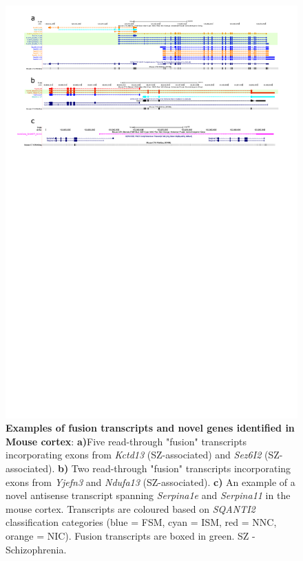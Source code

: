 \begin{landscape}
	\begin{figure}[htp]
		\begin{center}
			\includegraphics[page=1,trim={0 20cm 0 0},scale = 1.2]{Figures/FusionNovelGenes.pdf}
		\end{center}
		\vspace{1cm}
		\captionsetup{width=1.5\textwidth}
		\caption[Iso-Seq identifies fusion transcripts and novel genes in Mouse cortex]%
		{\textbf{Examples of fusion transcripts and novel genes identified in Mouse cortex}: \textbf{a)}Five read-through "fusion" transcripts incorporating exons from \textit{Kctd13} (SZ-associated) and \textit{Sez6I2} (SZ-associated). \textbf{b)} Two read-through "fusion" transcripts incorporating exons from \textit{Yjefn3} and \textit{Ndufa13} (SZ-associated). \textbf{c)} An example of a novel antisense transcript spanning \textit{Serpina1e} and \textit{Serpina11} in the mouse cortex. Transcripts are coloured based on \textit{SQANTI2} classification categories (blue = FSM, cyan = ISM, red = NNC, orange = NIC). Fusion transcripts are boxed in green. SZ - Schizophrenia.}   
		\label{fig:isoseq_whole_novelfusion}
	\end{figure}
\end{landscape}


